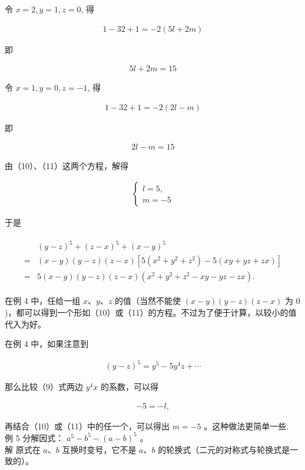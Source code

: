 \documentclass[10pt]{article}
\begin{document}
令 $x=2, y=1, z=0$, 得

\begin{align*}
1-32+1=-2(5 l+2 m)
\end{align*}

即

\begin{align*}
5 l+2 m=15 \tag{10}
\end{align*}

令 $x=1, y=0, z=-1$, 得

\begin{align*}
1-32+1=-2(2 l-m)
\end{align*}

即

\begin{align*}
2 l-m=15 \tag{11}
\end{align*}

由（10）、（11）这两个方程，解得

\begin{align*}
\left\{\begin{array}{l}
l=5, \\
m=-5
\end{array}\right.
\end{align*}

于是

\begin{align*}
\begin{aligned}
& (y-z)^{5}+(z-x)^{5}+(x-y)^{5} \\
= & (x-y)(y-z)(z-x)\left[5\left(x^{2}+y^{2}+z^{2}\right)-5(x y+y z+z x)\right] \\
= & 5(x-y)(y-z)(z-x)\left(x^{2}+y^{2}+z^{2}-x y-y z-z x\right) .
\end{aligned}
\end{align*}

在例 4 中，任给一组 $x 、 y 、 z$ 的值（当然不能使 $(x-y)(y-z)(z-x)$ 为 0 )，都可以得到一个形如（10）或（11）的方程。不过为了便于计算，以较小的值代入为好。

在例 4 中，如果注意到

\begin{align*}
(y-z)^{5}=y^{5}-5 y^{4} z+\cdots
\end{align*}

那么比较（9）式两边 $y^{4} x$ 的系数，可以得

\begin{align*}
-5=-l,
\end{align*}

再结合（10）或（11）中的任一个，可以得出 $m=-5$ 。这种做法更简单一些.\\
例 5 分解因式： $a^{5}-b^{5}-(a-b)^{5}$ 。\\
解 原式在 $a 、 b$ 互换时变号，它不是 $a 、 b$ 的轮换式（二元的对称式与轮换式是一致的）。
\end{document}
